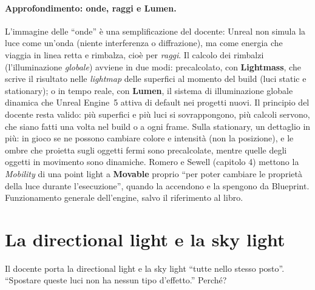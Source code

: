 \paragraph{Approfondimento: onde, raggi e Lumen.} L'immagine delle ``onde'' è una
semplificazione del docente: Unreal non simula la luce come un'onda (niente interferenza o
diffrazione), ma come energia che viaggia in linea retta e rimbalza, cioè per
\emph{raggi}. Il calcolo dei rimbalzi (l'illuminazione \emph{globale}) avviene in due modi:
precalcolato, con \textbf{Lightmass}, che scrive il risultato nelle \emph{lightmap} delle
superfici al momento del build (luci static e stationary); o in tempo reale, con
\textbf{Lumen}, il sistema di illuminazione globale dinamica che Unreal Engine~5 attiva di
default nei progetti nuovi. Il principio del docente resta valido: più superfici e più
luci si sovrappongono, più calcoli servono, che siano fatti una volta nel build o a ogni
frame. Sulla stationary, un dettaglio in più: in gioco se ne possono cambiare colore e
intensità (non la posizione), e le ombre che proietta sugli oggetti fermi sono precalcolate,
mentre quelle degli oggetti in movimento sono dinamiche. Romero e Sewell (capitolo 4)
mettono la \emph{Mobility} di una point light a \textbf{Movable} proprio ``per poter
cambiare le proprietà della luce durante l'esecuzione'', quando la accendono e la spengono
da Blueprint. Funzionamento generale dell'engine, salvo il riferimento al libro.

\section{La directional light e la sky light}
\label{ue13:sec:directional}

Il docente porta la directional light e la sky light ``tutte nello stesso posto''.
``Spostare queste luci non ha nessun tipo d'effetto.'' Perché?


